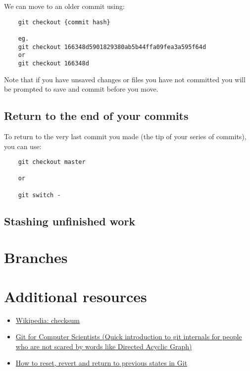 We can move to an older commit using:

\begin{verbatim}
    git checkout {commit hash}

    eg.
    git checkout 166348d5901829380ab5b44ffa09fea3a595f64d
    or
    git checkout 166348d
\end{verbatim}

Note that if you have unsaved changes or files you have not committed you will be prompted to save and commit before you move.
\\

\subsection{Return to the end of your commits}

To return to the very last commit you made (the tip of your series of commits), you can use:

\begin{verbatim}
    git checkout master

    or

    git switch -
\end{verbatim}

\subsection{Stashing unfinished work}


\section{Branches}

\section{Additional resources}

\begin{itemize}[leftmargin=*]
    \item \href{https://en.wikipedia.org/wiki/Checksum}{Wikipedia: checksum}
	\item \href{https://eagain.net/articles/git-for-computer-scientists/}{Git for Computer Scientists (Quick introduction to git internals for people who are not scared by words like Directed Acyclic Graph)}
	\item \href{https://opensource.com/article/18/6/git-reset-revert-rebase-commands}{How to reset, revert and return to previous states in Git}

\end{itemize}


